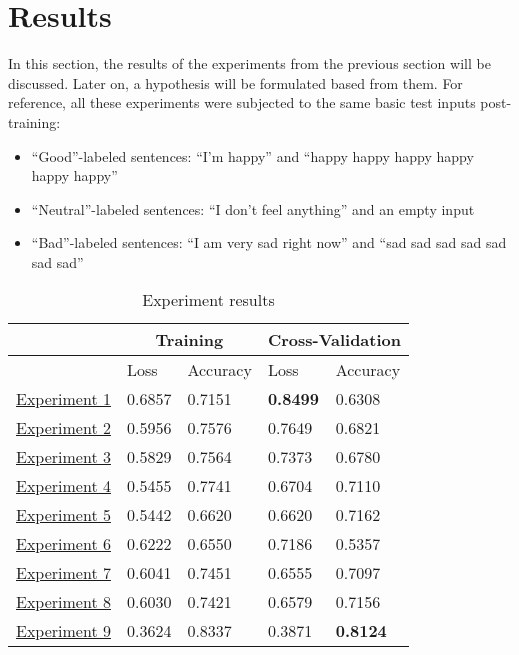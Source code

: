 \section{Results}
In this section, the results of the experiments from the previous section will be discussed. Later on, a hypothesis will be formulated based from them. For reference, all these experiments were subjected to the same basic test inputs post-training:
\begin{itemize}
	\item ``Good''-labeled sentences: ``I'm happy'' and ``happy happy happy happy happy happy''
	\item ``Neutral''-labeled sentences: ``I don't feel anything'' and an empty input
	\item ``Bad''-labeled sentences: ``I am very sad right now'' and ``sad sad sad sad sad sad sad''
\end{itemize}
\begin{table}[!h]
	\caption{Experiment results}
	\vspace{0.5cm}
	\centering
	\begin{tabular}[t]{|l|l|l|l|l|}
	\hline
	\multicolumn{1}{|c|}{} & \multicolumn{2}{c|}{Training} & \multicolumn{2}{c|}{Cross-Validation}
	\\ \hline
	\ & Loss & Accuracy & Loss & Accuracy
	\\ \hline
	\hyperref[exp1]{Experiment 1} & 0.6857 & 0.7151 & \textbf{0.8499} & 0.6308
	\\ \hline
	\hyperref[exp2]{Experiment 2} & 0.5956 & 0.7576 & 0.7649 & 0.6821
	\\ \hline
	\hyperref[exp3]{Experiment 3} & 0.5829 & 0.7564 & 0.7373 & 0.6780
	\\ \hline
	\hyperref[exp4]{Experiment 4} & 0.5455 & 0.7741 & 0.6704 & 0.7110
	\\ \hline
	\hyperref[exp5]{Experiment 5} & 0.5442 & 0.6620 & 0.6620 & 0.7162
	\\ \hline
	\hyperref[exp6]{Experiment 6} & 0.6222 & 0.6550 & 0.7186 & 0.5357
	\\ \hline
	\hyperref[exp7]{Experiment 7} & 0.6041 & 0.7451 & 0.6555 & 0.7097
	\\ \hline
	\hyperref[exp8]{Experiment 8} & 0.6030 & 0.7421 & 0.6579 & 0.7156
	\\ \hline
	\hyperref[exp9]{Experiment 9} & 0.3624 & 0.8337 & 0.3871 & \textbf{0.8124}
	\\ \hline
	\end{tabular}
\end{table}
\pagebreak

